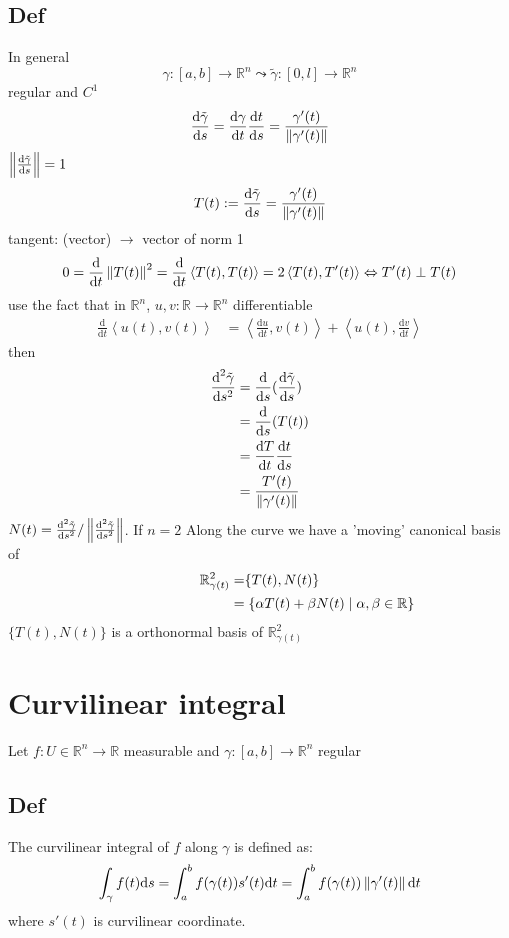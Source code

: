 \documentclass{book}
\begin{document}
\section{Def}
In general $$\gamma:[a,b]\rightarrow\mathbb{R}^n\leadsto \tilde{\gamma}:[0,l]\rightarrow\mathbb{R}^n$$
regular and $C^1$
$$\frac{\text{d}\tilde{\gamma}}{\text{d}s}=\frac{\text{d}\gamma}{\text{d}t}\frac{\text{d}t}{\text{d}s}=\frac{\gamma'(t)}{\left\lVert \gamma'(t) \right\rVert}$$
$\left\lVert \frac{\text{d}\tilde{\gamma}}{\text{d}s} \right\rVert=1$
$$T(t):=\frac{\text{d}\tilde{\gamma}}{\text{d}s}=\frac{\gamma'(t)}{\left\lVert \gamma'(t) \right\rVert}$$
tangent: (vector) $\rightarrow$ vector of norm 1
$$0=\frac{\text{d}}{\text{d}t}\left\lVert T(t) \right\rVert^2=\frac{\text{d}}{\text{d}t}\left<T(t),T(t)\right>=2\left<T(t),T'(t)\right>\Leftrightarrow T'(t)\perp T(t)$$
use the fact that in $\mathbb{R}^n$, $u,v:\mathbb{R}\rightarrow\mathbb{R}^n$ differentiable
$$\begin{aligned}
    \frac{\text{d}}{\text{d}t}\left<u(t),v(t)\right> &= \left<\frac{\text{d}u}{\text{d}t},v(t)\right>+\left<u(t),\frac{\text{d}v}{\text{d}t}\right>
\end{aligned}$$
then
$$
\begin{aligned}
    \frac{\text{d}^2\tilde{\gamma}}{\text{d}s^2}&=\frac{\text{d}}{\text{d}s}(\frac{\text{d}\tilde{\gamma}}{\text{d}s})\\
    &=\frac{\text{d}}{\text{d}s}(T(t))\\
    &=\frac{\text{d}T}{\text{d}t}\frac{\text{d}t}{\text{d}s}\\
    &=\frac{T'(t)}{\left\lVert \gamma'(t) \right\rVert}    
\end{aligned}$$
$N(t)=\frac{\text{d}^2\tilde{\gamma}}{\text{d}s^2}/\left\lVert \frac{\text{d}^2\tilde{\gamma}}{\text{d}s^2} \right\rVert$. If $n=2$
Along the curve we have a 'moving' canonical basis of 
$$\begin{aligned}
    \mathbb{R}^2_{\gamma(t)}&=\span\{T(t),N(t)\}\\
    &=\{\alpha T(t)+\beta N(t)\mid\alpha,\beta\in \mathbb{R}\}
\end{aligned}$$
$\{T(t),N(t)\}$ is a orthonormal basis of $\mathbb{R}^2_{\gamma(t)}$



\chapter{Curvilinear integral}
Let $f:U\in\mathbb{R}^n\rightarrow\mathbb{R}$ measurable and $\gamma:[a,b]\rightarrow\mathbb{R}^n$ regular
\section{Def}
The curvilinear integral of $f$ along $\gamma$ is defined as:
$$\int_\gamma f(t)\text{d}s=\int_a^bf(\gamma(t))s'(t)\text{d}t=\int_a^bf(\gamma(t))\left\lVert \gamma'(t) \right\rVert\text{d}t$$
where $s'(t)$ is curvilinear coordinate.
\end{document}
